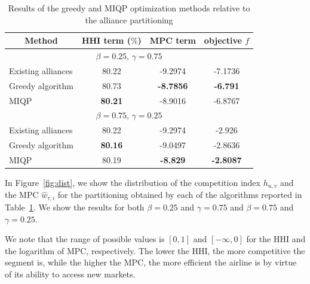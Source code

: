 \documentclass[preprint,times]{elsarticle}
\begin{document}
\begin{table}[h]
\centering
\caption{Results of the greedy and \ac{MIQP} optimization methods relative to the alliance partitioning}
\begin{tabular}{|l|ccc|}
\hline
\multicolumn{1}{|c|}{\centering\textbf{Method}} 	& \textbf{\ac{HHI} term} ($\%$) 	& \textbf{\ac{MPC} term} 	& \textbf{objective} $f$ 	\\ \hline
\multicolumn{4}{|c|}{\centering$\beta=0.25$, $\gamma=0.75$} 																			\\ \hline
Existing alliances 									& 80.22						& -9.2974					& -7.1736 					\\
Greedy algorithm 									& 80.73 					& \textbf{-8.7856} 			& \textbf{-6.791}			\\
\ac{MIQP} 											& \textbf{80.21} 			& -8.9016 					& -6.8767 					\\ \hline
\multicolumn{4}{|c|}{\centering$\beta=0.75$, $\gamma=0.25$} 																			\\ \hline
Existing alliances 									& 80.22						& -9.2974					& -2.926 					\\
Greedy algorithm 									& \textbf{80.16}			& -9.0497 					& -2.8636 					\\
\ac{MIQP} 											& 80.19 					& \textbf{-8.829} 			& \textbf{-2.8087} 			\\
\hline
\end{tabular}
\label{table:singleresults}
\end{table}

In Figure~\ref{fig:dist}, we show the distribution of the competition index $h_{u,v}$ and the \ac{MPC} $\hat{w}_{\tau,i}$ for the partitioning obtained by each of the algorithms reported in Table~\ref{table:singleresults}. We show the results for both $\beta=0.25$ and $\gamma=0.75$ and $\beta=0.75$ and $\gamma=0.25$.

We note that the range of possible values is $[0, 1]$ and $[-\infty, 0]$ for the \ac{HHI} and the logarithm of \ac{MPC}, respectively. The lower the \ac{HHI}, the more competitive the segment is, while the higher the \ac{MPC}, the more efficient the airline is by virtue of its ability to access new markets.
\end{document}
